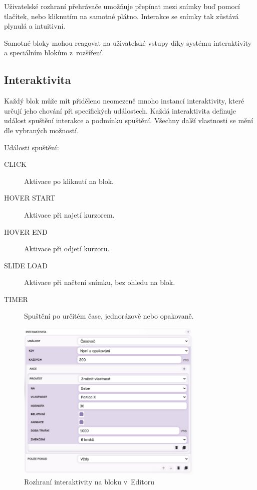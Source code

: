 Uživatelské rozhraní přehrávače umožňuje přepínat mezi snímky buď pomocí tlačítek, nebo kliknutím na samotné plátno.
Interakce se snímky tak zůstává plynulá a intuitivní. 

Samotné bloky mohou reagovat na uživatelské vstupy díky systému interaktivity a speciálním blokům z~rozšíření.

\subsection{Interaktivita}

Každý blok může mít přiděleno neomezeně mnoho instancí interaktivity, které určují jeho chování při specifických událostech. 
Každá interaktivita definuje událost spuštění interakce a podmínku spuštění.
Všechny další vlastnosti se mění dle vybraných možností.

Události spuštění:
\begin{description}
  \item[CLICK] Aktivace po kliknutí na blok.
  \item[HOVER START] Aktivace při najetí kurzorem.
  \item[HOVER END] Aktivace při odjetí kurzoru.
  \item[SLIDE LOAD] Aktivace při načtení snímku, bez ohledu na blok.
  \item[TIMER] Spuštění po určitém čase, jednorázově nebo opakovaně.
\end{description}


\begin{figure}[ht!]
    \centering
    \includegraphics[width=0.8\textwidth]{media/05_realizace/interaktivita.png}
    \caption{Rozhraní interaktivity na bloku v~Editoru}
    \label{fig:interaktivita}
\end{figure}


